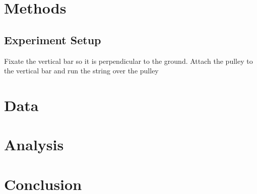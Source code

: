 \documentclass[12pt]{article}
\begin{document}
    \section{Methods}
        \subsection{Experiment Setup}
            Fixate the vertical bar so it is perpendicular to the ground.
            Attach the pulley to the vertical bar and run the string over
            the pulley
    \section{Data}

    \section{Analysis}

    \section{Conclusion}
\end{document}
